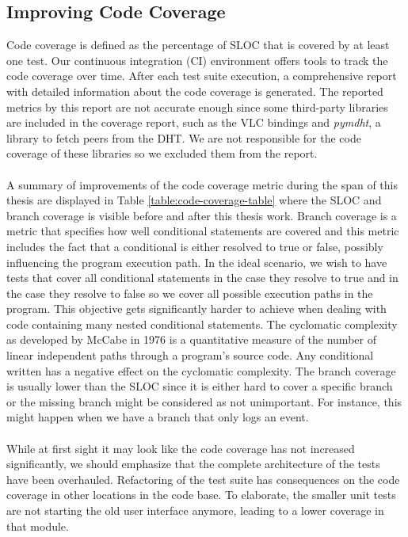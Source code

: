 \subsection{Improving Code Coverage}
Code coverage is defined as the percentage of SLOC that is covered by at least one test. Our continuous integration (CI) environment offers tools to track the code coverage over time. After each test suite execution, a comprehensive report with detailed information about the code coverage is generated. The reported metrics by this report are not accurate enough since some third-party libraries are included in the coverage report, such as the VLC bindings and \emph{pymdht}, a library to fetch peers from the DHT. We are not responsible for the code coverage of these libraries so we excluded them from the report.\\\\
A summary of improvements of the code coverage metric during the span of this thesis are displayed in Table \ref{table:code-coverage-table} where the SLOC and branch coverage is visible before and after this thesis work. Branch coverage is a metric that specifies how well conditional statements are covered and this metric includes the fact that a conditional is either resolved to true or false, possibly influencing the program execution path. In the ideal scenario, we wish to have tests that cover all conditional statements in the case they resolve to true and in the case they resolve to false so we cover all possible execution paths in the program. This objective gets significantly harder to achieve when dealing with code containing many nested conditional statements. The cyclomatic complexity as developed by McCabe in 1976\cite{mccabe1976complexity} is a quantitative measure of the number of linear independent paths through a program's source code. Any conditional written has a negative effect on the cyclomatic complexity. The branch coverage is usually lower than the SLOC since it is either hard to cover a specific branch or the missing branch might be considered as not unimportant. For instance, this might happen when we have a branch that only logs an event.\\\\
While at first sight it may look like the code coverage has not increased significantly, we should emphasize that the complete architecture of the tests have been overhauled. Refactoring of the test suite has consequences on the code coverage in other locations in the code base. To elaborate, the smaller unit tests are not starting the old user interface anymore, leading to a lower coverage in that module.\\\\

